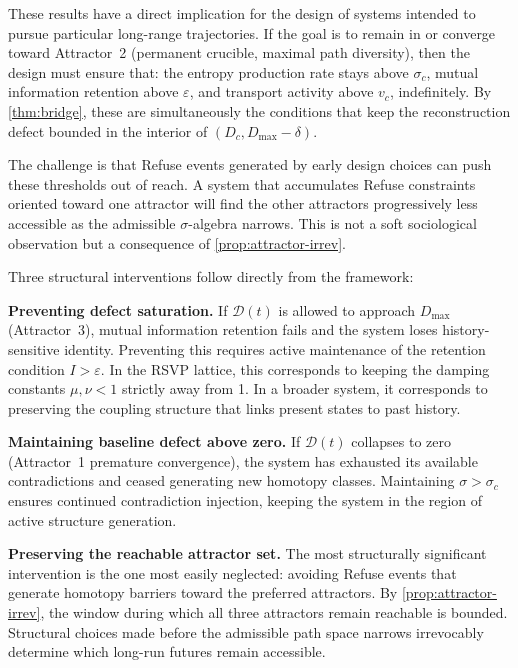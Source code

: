 \documentclass[12pt, oneside]{memoir}
\begin{document}
These results have a direct implication for the design of systems intended to pursue
particular long-range trajectories.  If the goal is to remain in or converge toward
Attractor~2 (permanent crucible, maximal path diversity), then the design must ensure
that: the entropy production rate stays above $\sigma_c$, mutual information retention
above $\varepsilon$, and transport activity above $v_c$, indefinitely.  By
\cref{thm:bridge}, these are simultaneously the conditions that keep the reconstruction
defect bounded in the interior of $(D_c, D_{\max} - \delta)$.

The challenge is that Refuse events generated by early design choices can push these
thresholds out of reach.  A system that accumulates Refuse constraints oriented toward
one attractor will find the other attractors progressively less accessible as the
admissible $\sigma$-algebra narrows.  This is not a soft sociological observation but a
consequence of \cref{prop:attractor-irrev}.

Three structural interventions follow directly from the framework:

\medskip\noindent
\textbf{Preventing defect saturation.}  If $\mathcal{D}(t)$ is allowed to approach
$D_{\max}$ (Attractor~3), mutual information retention fails and the system loses
history-sensitive identity.  Preventing this requires active maintenance of the retention
condition $I > \varepsilon$.  In the RSVP lattice, this corresponds to keeping the
damping constants $\mu, \nu < 1$ strictly away from 1.  In a broader system, it
corresponds to preserving the coupling structure that links present states to past history.

\medskip\noindent
\textbf{Maintaining baseline defect above zero.}  If $\mathcal{D}(t)$ collapses to zero
(Attractor~1 premature convergence), the system has exhausted its available
contradictions and ceased generating new homotopy classes.  Maintaining $\sigma > \sigma_c$
ensures continued contradiction injection, keeping the system in the region of active
structure generation.

\medskip\noindent
\textbf{Preserving the reachable attractor set.}  The most structurally significant
intervention is the one most easily neglected: avoiding Refuse events that generate
homotopy barriers toward the preferred attractors.  By \cref{prop:attractor-irrev}, the
window during which all three attractors remain reachable is bounded.  Structural choices
made before the admissible path space narrows irrevocably determine which long-run futures
remain accessible.
\end{document}
